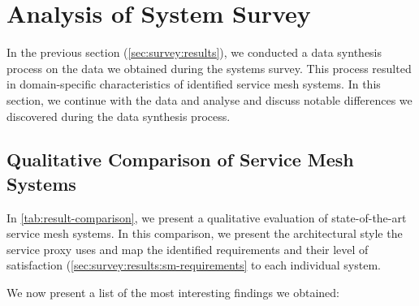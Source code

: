 \section{Analysis of System Survey}
\label{sec:survey:analysis}


In the previous section (\cref{sec:survey:results}), we conducted a data synthesis process on the data we obtained during the systems survey. This process resulted in domain-specific characteristics of identified service mesh systems. In this section, we continue with the data and analyse and discuss notable differences we discovered during the data synthesis process.



\subsection{Qualitative Comparison of Service Mesh Systems}
\label{sec:survey:analysis:sm-framework}

In \cref{tab:result-comparison}, we present a qualitative evaluation of state-of-the-art service mesh systems. In this comparison, we present the architectural style the service proxy uses and map the identified requirements and their level of satisfaction (\cref{sec:survey:results:sm-requirements} to each individual system. 




We now present a list of the most interesting findings we obtained:

